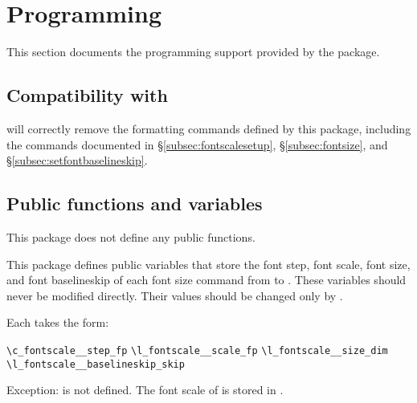 \documentclass{beery}
\begin{document}
\section{Programming}
\label{sec:programming}

This section documents the  programming support provided by the  package.

\subsection
  {%
    Compatibility with
    \texorpdfstring
      {}
      {\textbackslash{}text\_purify:n}%
  }
\label{subsec:textpurify}

 will correctly remove the formatting commands defined by this package, including the commands documented in \S\ref{subsec:fontscalesetup}, \S\ref{subsec:fontsize}, and \S\ref{subsec:setfontbaselineskip}.

\subsection{Public functions and variables}
\label{subsec:publicexpl3}

This package does not define any public  functions.

This package defines public  variables that store the font step, font scale, font size, and font baselineskip of each font size command from  to .
These variables should never be modified directly.
Their values should be changed only by .

Each takes the form:

\verb|\c_fontscale_|\verb|_step_fp|
\nopagebreak\newline
\verb|\l_fontscale_|\verb|_scale_fp|
\newline
\verb|\l_fontscale_|\verb|_size_dim|
\nopagebreak\newline
\verb|\l_fontscale_|\verb|_baselineskip_skip|

Exception:
 is not defined.
The font scale of  is stored in .
\end{document}
